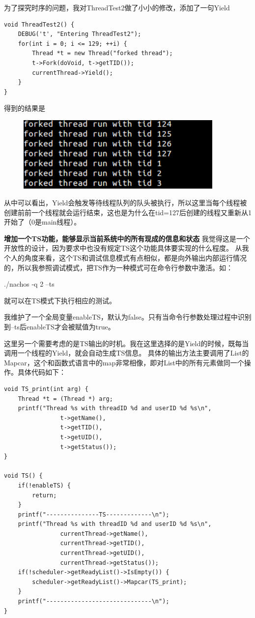 \documentclass{ctexart}
\begin{document}
为了探究时序的问题，我对ThreadTest2做了小小的修改，添加了一句Yield

\begin{lstlisting}
void ThreadTest2() {
    DEBUG('t', "Entering ThreadTest2");
    for(int i = 0; i <= 129; ++i) {
        Thread *t = new Thread("forked thread");
        t->Fork(doVoid, t->getTID());
        currentThread->Yield();
    }
}
\end{lstlisting}

得到的结果是
\begin{figure}[h]
 \centering
\includegraphics[width=4in]{ex1.png}
\end{figure}

从中可以看出，Yield会触发等待线程队列的队头被执行，所以这里当每个线程被创建前前一个线程就会运行结束，这也是为什么在tid=127后创建的线程又重新从1开始了（0是main线程）。

\textbf{增加一个TS功能，能够显示当前系统中的所有现成的信息和状态}
我觉得这是一个开放性的设计，因为要求中也没有规定TS这个功能具体要实现的什么程度。
从我个人的角度来看，这个TS和调试信息模式有点相似，都是向外输出内部运行情况的，所以我参照调试模式，把TS作为一种模式可在命令行参数中激活。如：

./nachos -q 2 --ts 

就可以在TS模式下执行相应的测试。

我维护了一个全局变量enableTS，默认为false。只有当命令行参数处理过程中识别到--ts后enableTS才会被赋值为true。

这里另一个需要考虑的是TS输出的时机。我在这里选择的是Yield的时候，既每当调用一个线程的Yield，就会自动生成TS信息。
具体的输出方法主要调用了List的Mapcar，这个和函数式语言中的map非常相像，即对List中的所有元素做同一个操作。具体代码如下：
\begin{lstlisting}
void TS_print(int arg) {
    Thread *t = (Thread *) arg;
    printf("Thread %s with threadID %d and userID %d %s\n", 
                t->getName(), 
                t->getTID(),
                t->getUID(),
                t->getStatus());
}

void TS() {
    if(!enableTS) {
        return;
    }
    printf("---------------TS-------------\n");
    printf("Thread %s with threadID %d and userID %d %s\n", 
                currentThread->getName(), 
                currentThread->getTID(),
                currentThread->getUID(),
                currentThread->getStatus());
    if(!scheduler->getReadyList()->IsEmpty()) {
        scheduler->getReadyList()->Mapcar(TS_print);
    }
    printf("------------------------------\n");
}
\end{lstlisting}
\end{document}
